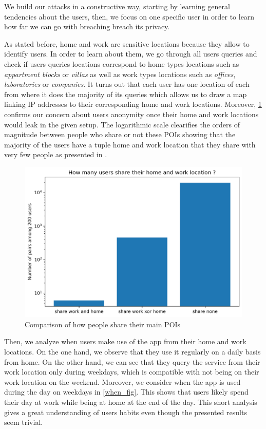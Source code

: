 \documentclass[10pt,conference,compsocconf]{IEEEtran}
\begin{document}
We build our attacks in a constructive way, starting by learning general tendencies about the users, then, we focus on one specific user in order to learn how far we can go with breaching breach its privacy.

As stated before, home and work are sensitive locations because they allow to identify users. In order to learn about them, we go through all users queries and check if users queries locations correspond to home types locations such as \textit{appartment blocks} or \textit{villas} as well as work types locations such as \textit{offices}, \textit{laboratories} or \textit{companies}. It turns out that each user has one location of each from where it does the majority of its queries which allows us to draw a map linking IP addresses to their corresponding home and work locations. Moreover, \ref{share_fig} confirms our concern about users anonymity once their home and work locations would leak in the given setup. The logarithmic scale clearifies the orders of magnitude between people who share or not these POIs showing that the majority of the users have a tuple home and work location that they share with very few people as presented in \cite{on}.

\begin{figure}
  \includegraphics[width=\columnwidth]{share.png}
  \caption{Comparison of how people share their main POIs}
  \label{share_fig}
\end{figure}

Then, we analyze when users make use of the app from their home and work locations. On the one hand, we observe that they use it regularly on a daily basis from home. On the other hand, we can see that they query the service from their work location only during weekdays, which is compatible with not being on their work location on the weekend. Moreover, we consider when the app is used during the day on weekdays in \ref{when_fig}. This shows that users likely spend their day at work while being at home at the end of the day. This short analysis gives a great understanding of users habits even though the presented results seem trivial.
\end{document}

